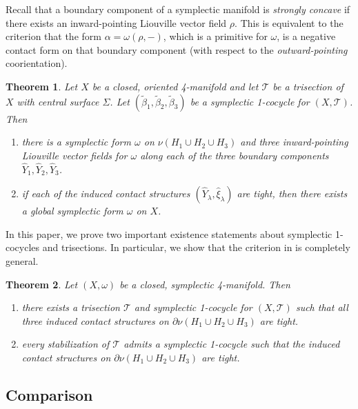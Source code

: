 \documentclass[11pt]{amsart}
\newtheorem{theorem}{Theorem}[section]
\theoremstyle{definition}
\theoremstyle{remark}
\numberwithin{equation}{section}
\newcommand{\betat}{\widetilde{\beta}}
\newcommand{\cT}{\mathcal{T}}
\begin{document}
Recall that a boundary component of a symplectic manifold is {\it strongly concave} if there exists an inward-pointing Liouville vector field $\rho$.  This is equivalent to the criterion that the form $\alpha = \omega(\rho,-)$, which is a primitive for $\omega$, is a negative contact form on that boundary component (with respect to the {\it outward-pointing} coorientation).

\begin{theorem}
\label{thrm:main-symp-cocycle}
Let $X$ be a closed, oriented 4-manifold and let $\cT$ be a trisection of $X$ with central surface $\Sigma$.  Let $(\betat_1,\betat_2,\betat_3)$ be a symplectic 1-cocycle for $(X,\cT)$.  Then
\begin{enumerate}
    \item there is a symplectic form $\omega$ on $\nu(H_1 \cup H_2 \cup H_3)$ and three inward-pointing Liouville vector fields for $\omega$ along each of the three boundary components $\widehat{Y}_1, \widehat{Y}_2, \widehat{Y}_3$.
\item if each of the induced contact structures $(\widehat{Y}_{\lambda},\widehat{\xi}_{\lambda})$ are tight, then there exists a global symplectic form $\omega$ on $X$.
\end{enumerate}
\end{theorem}

In this paper, we prove two important existence statements about symplectic 1-cocycles and trisections.  In particular, we show that the criterion in \cite{LC-symp-cocycle} is completely general.

\begin{theorem}
\label{thrm:symp-trisection-existence-stabilization}
Let $(X,\omega)$ be a closed, symplectic 4-manifold.  Then
\begin{enumerate}
    \item there exists a trisection $\cT$ and symplectic 1-cocycle for $(X,\cT)$ such that all three induced contact structures on $\partial \nu(H_1 \cup H_2 \cup H_3)$ are tight.
    \item every stabilization of $\cT$ admits a symplectic 1-cocycle such that the induced contact structures on $\partial \nu(H_1 \cup H_2 \cup H_3)$ are tight.
\end{enumerate}
\end{theorem}

\subsection{Comparison}
\end{document}
